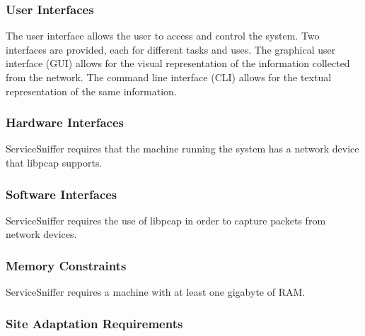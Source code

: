 \documentclass[titlepage]{article}
\begin{document}

\subsubsection{User Interfaces%
  \label{user-interfaces}%
}

The user interface allows the user to access and control the system. Two
interfaces are provided, each for different tasks and uses. The graphical user
interface (GUI) allows for the visual representation of the information
collected from the network. The command line interface (CLI) allows for the textual
representation of the same information.


\subsubsection{Hardware Interfaces%
  \label{hardware-interfaces}%
}

ServiceSniffer requires that the machine running the system has a network
device that libpcap supports.


\subsubsection{Software Interfaces%
  \label{software-interfaces}%
}

ServiceSniffer requires the use of libpcap in order to capture packets from
network devices.


\subsubsection{Memory Constraints%
  \label{memory-constraints}%
}

ServiceSniffer requires a machine with at least one gigabyte of RAM.


\subsubsection{Site Adaptation Requirements%
  \label{site-adaptation-requirements}%
}
\end{document}
